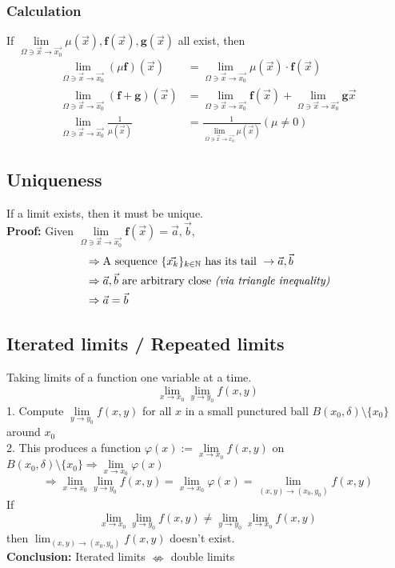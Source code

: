 \documentclass[11pt, a4paper]{article}
\begin{document}
        \subsubsection{Calculation}
        If $\lim\limits_{\Omega \ni \vec{x} \to \vec{x_0}} \mu(\vec{x}), \bm{f}(\vec{x}), \bm{g}(\vec{x})$ all exist, then
        $$\begin{aligned}
            \lim\limits_{\Omega \ni \vec{x} \to \vec{x_0}} (\mu\bm{f})(\vec{x}) &= \lim\limits_{\Omega \ni \vec{x} \to \vec{x_0}} \mu(\vec{x}) \cdot \bm{f}(\vec{x}) \\
            \lim\limits_{\Omega \ni \vec{x} \to \vec{x_0}}(\bm{f} + \bm{g})(\vec{x}) &= \lim\limits_{\Omega \ni \vec{x} \to \vec{x_0}}\bm{f}(\vec{x}) + \lim\limits_{\Omega \ni \vec{x} \to \vec{x_0}}\bm{g}{\vec{x}} \\
            \lim\limits_{\Omega \ni \vec{x} \to \vec{x_0}}\frac{1}{\mu(\vec{x})} &= \frac{1}{\lim\limits_{\Omega \ni \vec{x} \to \vec{x_0}}\mu(\vec{x})} (\mu \neq 0)
        \end{aligned}$$
    \subsection{Uniqueness}
    If a limit exists, then it must be unique. \\
        \textbf{Proof:} Given $\lim\limits_{\Omega \ni \vec{x} \to \vec{x_0}} \bm{f}(\vec{x}) = \vec{a}, \vec{b}$,
        $$\begin{aligned}
            &\Rightarrow \text{A sequence } \{\vec{x_k}\}_{k \in \mathbb{N}} \text{ has its tail } \to \vec{a}, \vec{b} \\
            &\Rightarrow \vec{a}, \vec{b} \text{ are arbitrary close \textit{(via triangle inequality)}} \\
            &\Rightarrow \vec{a} = \vec{b}
        \end{aligned}$$
    \subsection{Iterated limits / Repeated limits}
    Taking limits of a function one variable at a time.
    $$\lim_{x \to x_0}\lim_{y \to y_0} f(x, y)$$
    1. Compute $\lim\limits_{y \to y_0} f(x, y)$ for all $x$ in a small punctured ball $B(x_0, \delta) \setminus \{x_0\}$ around $x_0$ \\
    2. This produces a function $\varphi(x) := \lim\limits_{x \to x_0} f(x, y)$ on $B(x_0, \delta) \setminus \{x_0 \} \Rightarrow \lim\limits_{x \to x_0} \varphi(x)$
    $$\Rightarrow \lim_{x \to x_0}\lim_{y \to y_0} f(x, y) = \lim\limits_{x \to x_0} \varphi(x) = \lim_{(x, y) \to (x_0, y_0)} f(x, y)$$
    If $$\lim_{x \to x_0}\lim_{y \to y_0} f(x, y) \neq \lim_{y \to y_0}\lim_{x \to x_0} f(x, y)$$
    then $\lim_{(x, y) \to (x_0, y_0)} f(x, y)$ doesn't exist. \\
    \textbf{Conclusion:} Iterated limits $\nLeftrightarrow$ double limits
\end{document}
